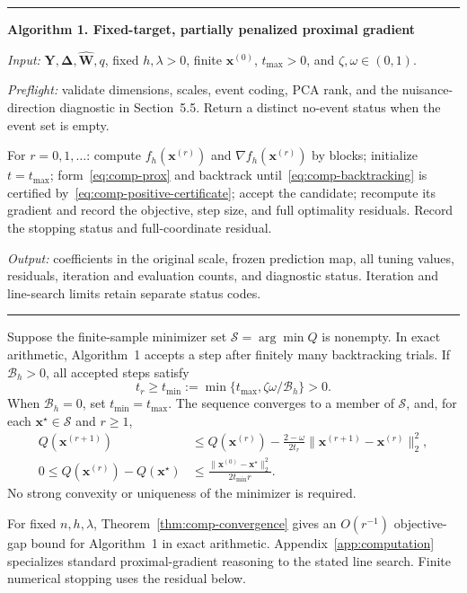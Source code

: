 \medskip
\noindent\begin{minipage}{\textwidth}
\small
\hrule\vspace{5pt}
\textbf{Algorithm 1. Fixed-target, partially penalized proximal gradient}\par
\textit{Input:} $\bm Y,\bm\Delta,\widehat{\bm{W}},q$, fixed $h,\lambda>0$, finite $\bm{x}^{(0)}$, $t_{\max}>0$, and $\zeta,\omega\in(0,1)$.\par
\textit{Preflight:} validate dimensions, scales, event coding, PCA rank, and the nuisance-direction diagnostic in Section~5.5. Return a distinct no-event status when the event set is empty.\par
For $r=0,1,\ldots$: compute $f_h(\bm{x}^{(r)})$ and $\nabla f_h(\bm{x}^{(r)})$ by blocks; initialize $t=t_{\max}$; form~\eqref{eq:comp-prox} and backtrack until~\eqref{eq:comp-backtracking} is certified by~\eqref{eq:comp-positive-certificate}; accept the candidate; recompute its gradient and record the objective, step size, and full optimality residuals. Record the stopping status and full-coordinate residual.\par
\textit{Output:} coefficients in the original scale, frozen prediction map, all tuning values, residuals, iteration and evaluation counts, and diagnostic status. Iteration and line-search limits retain separate status codes.\par
\vspace{5pt}\hrule
\end{minipage}
\medskip

\begin{theorem}
\label{thm:comp-convergence}
Suppose the finite-sample minimizer set $\mathcal S=\arg\min Q$ is nonempty. In exact arithmetic, Algorithm~1 accepts a step after finitely many backtracking trials. If $\mathscr B_h>0$, all accepted steps satisfy
\begin{equation}
 t_r\ge t_{\min}:=\min\{t_{\max},\zeta\omega/\mathscr B_h\}>0.
 \label{eq:comp-tmin}
\end{equation}
When $\mathscr B_h=0$, set $t_{\min}=t_{\max}$. The sequence converges to a member of $\mathcal S$, and, for each $\bm{x}^\star\in\mathcal S$ and $r\ge1$,
\begin{align}
 Q(\bm{x}^{(r+1)})&\le Q(\bm{x}^{(r)})-
      \frac{2-\omega}{2t_r}\|\bm{x}^{(r+1)}-\bm{x}^{(r)}\|_2^2,
      \label{eq:comp-descent}\\
 0\le Q(\bm{x}^{(r)})-Q(\bm{x}^\star)&\le
      \frac{\|\bm{x}^{(0)}-\bm{x}^\star\|_2^2}{2t_{\min}r}.
      \label{eq:comp-rate}
\end{align}
No strong convexity or uniqueness of the minimizer is required.
\end{theorem}
For fixed $n,h,\lambda$, Theorem~\ref{thm:comp-convergence} gives an $O(r^{-1})$ objective-gap bound for Algorithm~1 in exact arithmetic. Appendix~\ref{app:computation} specializes standard proximal-gradient reasoning \citep{BeckTeboulle2009,ParikhBoyd2014} to the stated line search. Finite numerical stopping uses the residual below.

